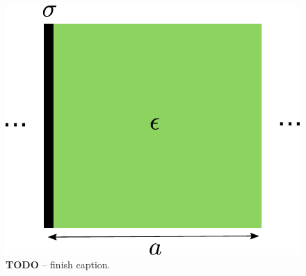 \begin{figure}
    \centering
    \includegraphics[width=\columnwidth]{figures/superlattice-geometry.pdf}
    \caption{
    {\bf TODO} -- finish caption.
    }
    \label{figure: superlattice geometry}
\end{figure}

